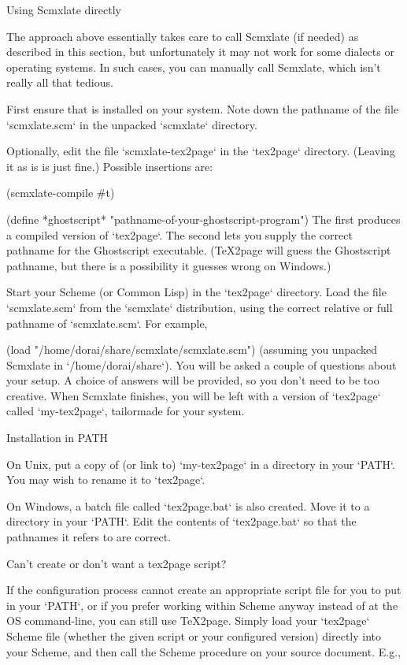 \beginsection  Using Scmxlate directly

The  approach above
essentially takes care to call Scmxlate (if needed) as described in
this section, but unfortunately it may not work for
some dialects or operating systems.  In such cases, you
can manually call Scmxlate, which isn’t really all that
tedious.

First ensure that
is installed on your system.  Note down the pathname of
the file `scmxlate.scm` in the unpacked `scmxlate`
directory.

Optionally, edit the file `scmxlate-tex2page` in the
`tex2page` directory.
(Leaving it as is is just fine.)
Possible insertions are:

\begintts
(scmxlate-compile #t)

(define *ghostscript* "pathname-of-your-ghostscript-program")
\endtt
%
The first produces a compiled version of
`tex2page`.   The second lets you supply the
correct pathname for the Ghostscript executable.
(\TeX2page will guess the Ghostscript pathname,
but there is a possibility it guesses wrong on
Windows.)

Start your Scheme (or Common Lisp) in the
`tex2page` directory.   Load the file
`scmxlate.scm` from the
`scmxlate` distribution, using the correct relative
or full pathname of `scmxlate.scm`.  For example,

\begintts
(load "/home/dorai/share/scmxlate/scmxlate.scm")
\endtt
%
(assuming you unpacked Scmxlate in
`/home/dorai/share`).  You will be asked a couple
of questions about your setup.  A choice of answers
will be provided, so you don’t need to be too creative.
When Scmxlate finishes, you will be left with a
version of `tex2page` called `my-tex2page`,
tailormade for your system.

\beginsection Installation in {PATH}

On Unix, put a copy of (or link to) `my-tex2page`
in a directory in your `PATH`.  You may wish to
rename it to `tex2page`.

On Windows, a batch file called `tex2page.bat`
is also created.  Move it to a directory in your
`PATH`.  Edit the contents of `tex2page.bat` so
that the pathnames it refers to are correct.

\beginsection Can’t create or don’t want a {tex2page
script?}

If the configuration process cannot create an
appropriate script file for you to put in your
`PATH`, or if you prefer working within Scheme
anyway instead of at the OS command-line,
you can still use \TeX2page.  Simply load
your `tex2page` Scheme file
(whether the given script or your configured version)
directly into
your Scheme, and then call the Scheme
procedure  on your source document.  E.g.,

